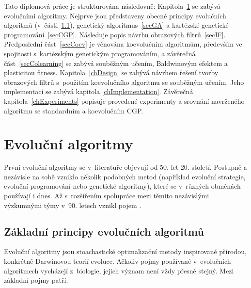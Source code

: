 Tato diplomová práce je strukturována následovně: Kapitola~\ref{chEA} se zabývá evolučními algoritmy. Nejprve jsou představeny obecné principy evolučních algoritmů (v~části~\ref{secEAGeneral}), genetický algoritmus~\ref{secGA} a kartézské genetické programování~\ref{secCGP}. Následuje popis návrhu obrazových filtrů~\ref{secIF}. Předposlední část~\ref{secCoev} je věnována koevolučním algoritmům, především ve spojitosti s~kartézským genetickým programováním, a závěrečná část~\ref{secColearning} se zabývá souběžným učením, Baldwinovým efektem a plasticitou fitness. Kapitola~\ref{chDesign} se zabývá návrhem řešení tvorby obrazových filtrů s~použitím koevolučního algoritmu se souběžným učením. Jeho implementací se zabývá kapitola \ref{chImplementation}. Závěrečná kapitola~\ref{chExperiments} popisuje provedené experimenty a srovnání navrženého algoritmu se standardním a koevolučním CGP.

\chapter{Evoluční algoritmy}
\label{chEA}

První evoluční algoritmy se v~literatuře objevují od 50. let 20. století. Postupně a nezávisle na sobě vzniklo několik podobných metod (například evoluční strategie, evoluční programování nebo genetické algoritmy), které se v~různých obměnách používají i dnes. Až s~rozšířením spolupráce mezi těmito nezávislými výzkumnými týmy v~90. letech vznikl pojem  \cite{Modra}.

\section{Základní principy evolučních algoritmů}
\label{secEAGeneral}

Evoluční algoritmy jsou stoachastické optimalizační metody inspirované přírodou, konkrétně Darwinovou teorií evoluce. Ačkoliv pojmy používané v~evolučních algoritmech vycházejí z~biologie, jejich význam není vždy přesně stejný. Mezi základní pojmy patří:

